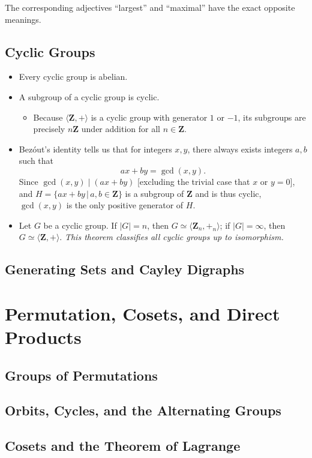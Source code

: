 \documentclass[11pt]{article}
\newcommand{\where}{\,|\,}
\newcommand{\Z}{\mathbf{Z}}
\newcommand{\la}{\langle}
\newcommand{\ra}{\rangle}
\begin{document}
The corresponding adjectives ``largest'' and ``maximal'' have the exact opposite meanings.

\subsection{Cyclic Groups}
\begin{itemize}
    \item Every cyclic group is abelian.
    \item A subgroup of a cyclic group is cyclic.
    \begin{itemize}
        \item Because $\la \Z,+ \ra$ is a cyclic group with generator $1$ or $-1$, its subgroups are precisely $n\Z$ under addition for all $n \in \Z$.
    \end{itemize}
    \item Bezóut's identity tells us that for integers $x,y$, there always exists integers $a,b$ such that \[ax+by = \gcd(x,y).\] Since $\gcd(x,y) \mid (ax+by)$ [excluding the trivial case that $x$ or $y = 0$], and $H = \{ax+by \where a,b \in \Z\}$ is a subgroup of $\Z$ and is thus cyclic, $\gcd(x,y)$ is the only positive generator of $H$.
    \item Let $G$ be a cyclic group. If $|G| = n$, then $G \simeq \la \Z_n,+_n \ra$; if $|G| = \infty$, then $G \simeq \la \Z,+ \ra$. \emph{This theorem classifies all cyclic groups up to isomorphism.}
\end{itemize}

\subsection{Generating Sets and Cayley Digraphs}






\section{Permutation, Cosets, and Direct Products}
\subsection{Groups of Permutations}
\subsection{Orbits, Cycles, and the Alternating Groups}
\subsection{Cosets and the Theorem of Lagrange}
\end{document}
